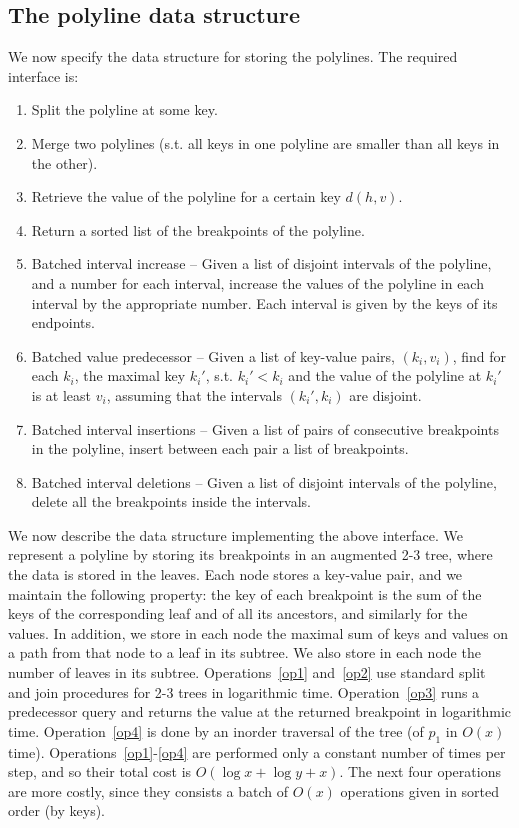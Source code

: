 \documentclass[a4paper,UKenglish]{lipics-v2016}
\theoremstyle{plain}
\begin{document}
\subsection{The polyline data structure} We now specify the data structure for storing the polylines. The required interface is:
\begin{enumerate}
\item \label{op1} Split the polyline at some key.
\item \label{op2} Merge two polylines (s.t. all  keys in one polyline are smaller than all keys in the other).
\item \label{op3} Retrieve the value of the polyline for a certain key $d(h,v)$.
\item \label{op4}Return a sorted list of the breakpoints of the polyline.
\item \label{op5} Batched interval increase -- Given a list of disjoint intervals of the polyline, and a number for each interval, increase the values of the polyline in each interval by the appropriate number. Each interval is given by the keys of its endpoints.
\item \label{op6} Batched value predecessor -- Given a list of key-value pairs, $(k_i,v_i)$, find for each $k_i$, the maximal key $k_{i}'$, s.t. $k_{i}' < k_i$ and the value of the polyline at $k_{i}'$ is at least $v_i$, assuming that the intervals $(k_{i}',k_{i})$ are disjoint.
\item \label{op7} Batched interval insertions -- Given a list of pairs of consecutive breakpoints in the polyline, insert between each pair a list of breakpoints.
\item \label{op8} Batched interval deletions -- Given a list of disjoint intervals of the polyline, delete all the breakpoints inside the intervals.
\end{enumerate}
We now describe the data structure implementing the above interface. We represent a polyline by storing its breakpoints in an augmented 2-3 tree, where the data is stored in the leaves. Each node stores a key-value pair, and we maintain the following property: the key of each breakpoint is the sum of the keys of the corresponding leaf and of all its ancestors, and similarly for the values. In addition, we store in each node the maximal sum of keys and values on a path from that node to a leaf in its subtree. We also store in each node the number of leaves in its subtree. %
Operations~\ref{op1} and~\ref{op2} use standard split and join procedures for 2-3 trees in logarithmic time. 
Operation~\ref{op3} runs a predecessor query and returns the value at the returned breakpoint in logarithmic time.
Operation~\ref{op4} is done by an inorder traversal of the tree (of $p_{1}$ in $O(x)$ time). 
Operations~\ref{op1}-\ref{op4} are performed only a constant number of times per step, and so their total cost is $O(\log x + \log y + x)$. The next four operations are more costly, since they consists a batch of $O(x)$ operations given in sorted order (by keys).
\end{document}
